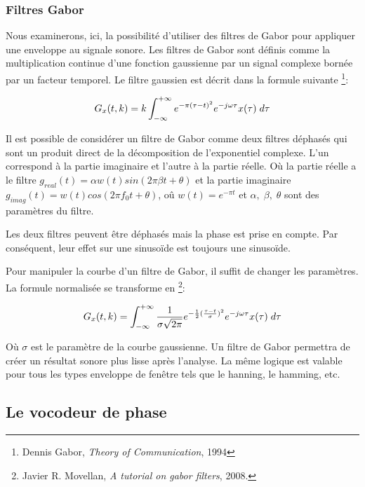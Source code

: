 \subsubsection{Filtres Gabor}

Nous examinerons, ici, la possibilité d’utiliser des filtres de Gabor pour appliquer une enveloppe au signale sonore. Les filtres de Gabor sont définis comme la multiplication continue d'une fonction gaussienne par un signal complexe bornée par un facteur temporel. Le filtre gaussien est décrit dans la formule suivante \footnote{Dennis Gabor, \textit{Theory of Communication}, 1994 \nocite{Gab44}}:

\begin{equation}
    G_x(t,k) = k \int_{-\infty}^{+\infty} e ^ {-\pi(\tau-t)^2} e ^ {-j \omega \tau} x(\tau)\hspace{1mm} d\tau  
\end{equation}

Il est possible de considérer un filtre de Gabor comme deux filtres déphasés qui sont un produit direct de la décomposition de l'exponentiel complexe. L'un correspond à la partie imaginaire et l'autre à la partie réelle. Où la partie réelle a le filtre $ g_{real} (t) = \alpha w (t) sin (2 \pi \beta t + \theta) $ et la partie imaginaire $ g_{imag} (t) = w (t) cos (2 \pi f_0 t + \theta) $, oû $w(t) = e^{- \pi t}$ et $\alpha, \; \beta, \; \theta$ sont des paramètres du filtre.

Les deux filtres peuvent être déphasés mais la phase est prise en compte. Par conséquent, leur effet sur une sinusoïde est toujours une sinusoïde.

Pour manipuler la courbe d'un filtre de Gabor, il suffit de changer les paramètres. La formule normalisée se transforme en \footnote{Javier R. Movellan, \textit{A tutorial on gabor filters}, 2008. \nocite{Tut2002}}:

\begin{equation}
    G_x(t,k) = \int_{-\infty}^{+\infty} \frac{1}{\sigma \sqrt{2 \pi}} e ^ {-\frac{1}{2}(\frac{\tau-t}{\sigma})^2} e ^ {-j\omega \tau} x(\tau)\hspace{1mm} d\tau  
\end{equation}

Où $ \sigma $ est le paramètre de la courbe gaussienne. Un filtre de Gabor permettra de créer un résultat sonore plus lisse après l'analyse. La même logique est valable pour tous les types enveloppe de fenêtre tels que le hanning, le hamming, etc.

    \subsection{Le vocodeur de phase}    
    
